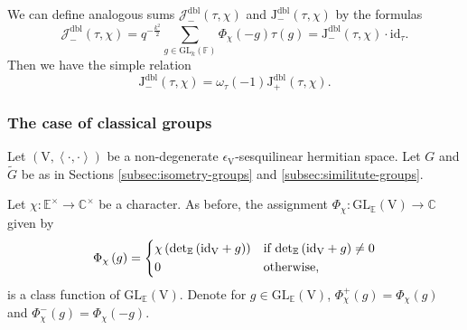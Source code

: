 \documentclass[12pt, reqno]{amsart}
\theoremstyle{definition}
\theoremstyle{definition}
\theoremstyle{definition}
\newcommand{\cComplex}{\mathbb{C}}
\newcommand{\multiplicativegroup}[1]{#1^{\times}}
\newcommand{\detQuadratic}{{\det}_{\quadraticExtension}}
\newcommand{\idmap}{\mathrm{id}}
\newcommand{\hermitianSpace}{\mathrm{V}}
\newcommand{\innerproduct}[2]{\left\langle #1,#2\right\rangle}
\newcommand{\centralCharacter}[1]{\omega_{#1}}
\newcommand{\GL}{\mathrm{GL}}
\newcommand{\finiteField}{\mathbb{F}}
\newcommand{\quadraticExtension}{\mathbb{E}}
\newcommand{\negDblJacobiSum}[2]{\mathcal{J}_{-}^{\mathrm{dbl}}\left(#1, #2\right)}
\newcommand{\JacobiKernel}[1]{\Phi_{#1}}
\newcommand{\posJacobiKernel}[1]{\Phi^{+}_{#1}}
\newcommand{\negJacobiKernel}[1]{\Phi^{-}_{#1}}
\newcommand{\posDblJacobiSumScalar}[2]{\mathrm{J}_{+}^{\mathrm{dbl}}\left(#1, #2\right)}
\newcommand{\negDblJacobiSumScalar}[2]{\mathrm{J}_{-}^{\mathrm{dbl}}\left(#1, #2\right)}
\begin{document}
We can define analogous sums $\negDblJacobiSum{\tau}{\chi}$ and $\negDblJacobiSumScalar{\tau}{\chi}$ by the formulas
$$\negDblJacobiSum{\tau}{\chi} = q^{-\frac{k^2}{2}} \sum_{g \in \GL_k\left(\finiteField\right)} \Phi_{\chi}\left(-g\right) \tau\left(g\right) = \negDblJacobiSumScalar{\tau}{\chi} \cdot \idmap_{\tau}.$$
Then we have the simple relation
$$\negDblJacobiSumScalar{\tau}{\chi} = \centralCharacter{\tau}\left(-1\right) \posDblJacobiSumScalar{\tau}{\chi}.$$

\subsubsection{The case of classical groups}

Let $\left(\hermitianSpace, \innerproduct{\cdot}{\cdot}\right)$ be a non-degenerate $\epsilon_{\hermitianSpace}$-sesquilinear hermitian space. Let $G$ and $\tilde{G}$ be as in Sections \ref{subsec:isometry-groups} and \ref{subsec:similitute-groups}.

Let $\chi \colon \multiplicativegroup{\quadraticExtension} \to \multiplicativegroup{\cComplex}$ be a character. As before, the assignment $\JacobiKernel{\chi} \colon \GL_{\quadraticExtension}\left(\hermitianSpace\right) \to \cComplex$ given by $$\JacobiKernel{\chi}\left(g\right) = \begin{dcases}
	\chi\left(\detQuadratic\left( \idmap_{\hermitianSpace} + g\right)\right) & \text{if }\detQuadratic\left( \idmap_{\hermitianSpace} + g\right) \ne 0\\
	0 & \text{otherwise,}
\end{dcases}$$
is a class function of $\GL_{\quadraticExtension}\left(\hermitianSpace\right)$. Denote for $g \in \GL_{\quadraticExtension}\left(\hermitianSpace\right)$, $\posJacobiKernel{\chi}\left(g\right) = \JacobiKernel{\chi}\left(g\right)$ and $\negJacobiKernel{\chi}\left(g\right) = \JacobiKernel{\chi}\left(-g\right)$.
\end{document}
